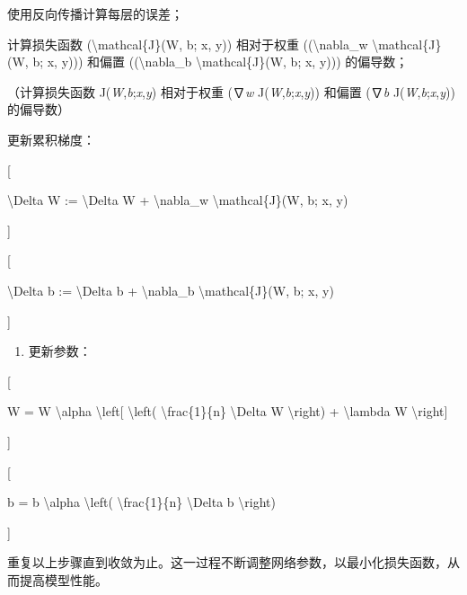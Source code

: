 使用反向传播计算每层的误差；

计算损失函数 (\textbackslash mathcal\{J\}(W, b; x, y)) 相对于权重
((\textbackslash nabla\_w \textbackslash mathcal\{J\}(W, b; x, y)))
和偏置 ((\textbackslash nabla\_b \textbackslash mathcal\{J\}(W, b; x,
y))) 的偏导数；

（计算损失函数 J(\emph{W},\emph{b};\emph{x},\emph{y}) 相对于权重
(∇\emph{w} J(\emph{W},\emph{b};\emph{x},\emph{y})) 和偏置 (∇\emph{b}
J(\emph{W},\emph{b};\emph{x},\emph{y})) 的偏导数）

更新累积梯度：

{[}

\textbackslash Delta W\textquotesingle{} := \textbackslash Delta
W\textquotesingle{} + \textbackslash nabla\_w
\textbackslash mathcal\{J\}(W, b; x, y)

{]}

{[}

\textbackslash Delta b\textquotesingle{} := \textbackslash Delta
b\textquotesingle{} + \textbackslash nabla\_b
\textbackslash mathcal\{J\}(W, b; x, y)

{]}


\begin{enumerate}
\def\labelenumi{\arabic{enumi}.}
\item
  更新参数：
\end{enumerate}

{[}

W\textquotesingle{} = W\textquotesingle{} \textbackslash alpha
\textbackslash left{[} \textbackslash left(
\textbackslash frac\{1\}\{n\} \textbackslash Delta W\textquotesingle{}
\textbackslash right) + \textbackslash lambda W\textquotesingle{}
\textbackslash right{]}

{]}

{[}

b\textquotesingle{} = b\textquotesingle{} \textbackslash alpha
\textbackslash left( \textbackslash frac\{1\}\{n\} \textbackslash Delta
b\textquotesingle{} \textbackslash right)

{]}


重复以上步骤直到收敛为止。这一过程不断调整网络参数，以最小化损失函数，从而提高模型性能。


